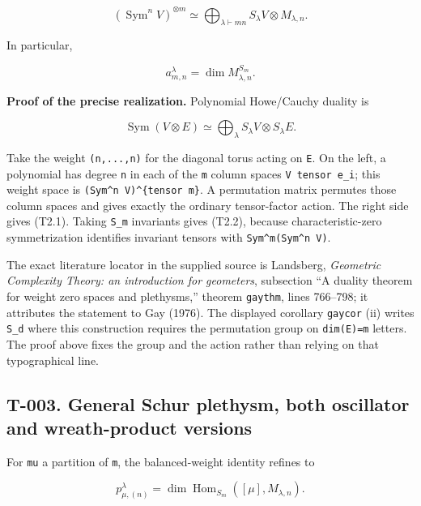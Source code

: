 \documentclass[
  10pt,
]{article}
\begin{document}
\[
(\operatorname{Sym}^n V)^{\otimes m}
\simeq \bigoplus_{\lambda\vdash mn} S_\lambda V\otimes M_{\lambda,n}.
\tag{T2.1}
\]

In particular,

\[
\boxed{a_{m,n}^{\lambda}=\dim M_{\lambda,n}^{S_m}}.
\tag{T2.2}
\]

\textbf{Proof of the precise realization.} Polynomial Howe/Cauchy
duality is

\[
\operatorname{Sym}(V\otimes E)
\simeq\bigoplus_\lambda S_\lambda V\otimes S_\lambda E.
\]

Take the weight
\texttt{\small (\allowbreak{}n,\allowbreak{}...,\allowbreak{}n)\allowbreak{}}
for the diagonal torus acting on \texttt{\small E}. On the left, a
polynomial has degree \texttt{\small n} in each of the \texttt{\small m}
column spaces \texttt{\small V tensor e\_\allowbreak{}i}; this weight
space is
\texttt{\small (\allowbreak{}Sym\textasciicircum{}n V)\allowbreak{}\textasciicircum{}\{tensor m\}}.
A permutation matrix permutes those column spaces and gives exactly the
ordinary tensor-factor action. The right side gives (T2.1). Taking
\texttt{\small S\_\allowbreak{}m} invariants gives (T2.2), because
characteristic-zero symmetrization identifies invariant tensors with
\texttt{\small Sym\textasciicircum{}m(\allowbreak{}Sym\textasciicircum{}n V)\allowbreak{}}.

The exact literature locator in the supplied source is Landsberg,
\emph{Geometric Complexity Theory: an introduction for geometers},
subsection ``A duality theorem for weight zero spaces and plethysms,''
theorem \texttt{\small gaythm}, lines 766--798; it attributes the
statement to Gay (1976). The displayed corollary \texttt{\small gaycor}
(ii) writes \texttt{\small S\_\allowbreak{}d} where this construction
requires the permutation group on
\texttt{\small dim(\allowbreak{}E)\allowbreak{}=\allowbreak{}m} letters.
The proof above fixes the group and the action rather than relying on
that typographical line.

\subsection{T-003. General Schur plethysm, both oscillator and
wreath-product
versions}\label{t-003.-general-schur-plethysm-both-oscillator-and-wreath-product-versions}

For \texttt{\small mu} a partition of \texttt{\small m}, the
balanced-weight identity refines to

\[
\boxed{p_{\mu,(n)}^\lambda
=\dim\operatorname{Hom}_{S_m}([\mu],M_{\lambda,n}).}
\tag{T3.1}
\]
\end{document}
